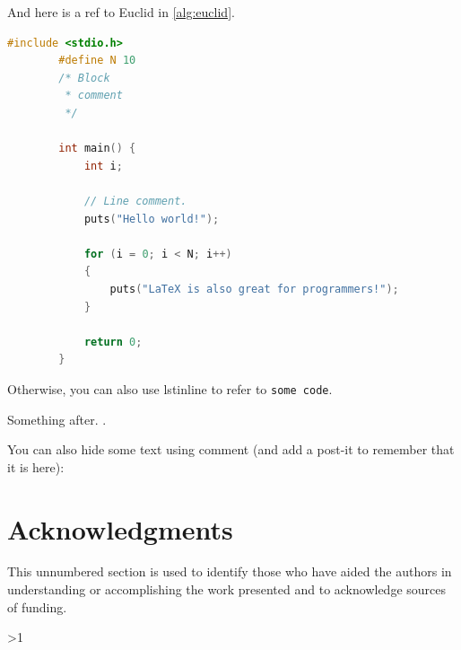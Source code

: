 \documentclass[a4paper]{article}  %
\newcommand{\Pathbasebib}{\PathR/ref_RN.bib,\PathR/ref_XX.bib}%
\begin{document}
    And here is a ref to Euclid in \cref{alg:euclid}.

	\FloatBarrier

    \begin{lstlisting}[language=C++, frame=single, caption=An extract of \lstinline$C++$ code using 'listing'., gobble=8]
        #include <stdio.h>
        #define N 10
        /* Block
         * comment
         */

        int main() {
            int i;

            // Line comment.
            puts("Hello world!");

            for (i = 0; i < N; i++)
            {
                puts("LaTeX is also great for programmers!");
            }

            return 0;
        }
    \end{lstlisting}

    

    Otherwise, you can also use lstinline to refer to \lstinline{some code}.

    Something after.
    .

    You can also hide some text using comment (and add a post-it to remember that it is here):

\section*{Acknowledgments}

    This unnumbered section is used to identify those who have aided the authors in understanding or accomplishing the work presented and to acknowledge sources of funding.


\ifnum\value{levelstanda}>1
	{}%
\else

	\printunsrtglossary[type=acronym]
	\printunsrtglossary[type=symbol]
\fi

\addtocounter{levelstanda}{-1}
\end{document}
